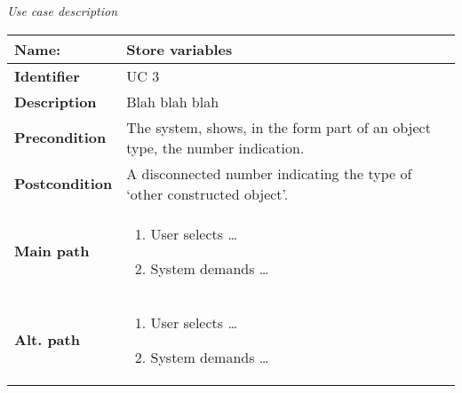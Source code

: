 \documentclass{article}
\newcommand\addrow[2]{#1 &#2\\ }
\newcommand\addheading[2]{#1 &#2\\ \hline}
\newcommand\tabularhead{\begin{tabular}{lp{10cm}}
\hline
}
\newcommand\addmulrow[2]{ \begin{minipage}[t][][t]{2.5cm}#1\end{minipage}%
   &\begin{minipage}[t][][t]{10cm}
    \begin{enumerate} #2   \end{enumerate}
    \end{minipage}\\ }
\newenvironment{usecase}{\tabularhead}
{\hline\end{tabular}}
\begin{document}
{\Large\textit{Use case description}} \\
\begin{usecase}
  \addheading{\textbf{Name:}}{Store variables}
  \addheading{\textbf{Identifier}}{UC 3}
  \addrow{\textbf{Description}}{Blah blah blah}
  \addrow{\textbf{Precondition}}{The system, shows, in the form part of an object type, the number   indication.}
  \addrow{\textbf{Postcondition}}{A disconnected number indicating the type of `other constructed object'.}
  \addmulrow{\textbf{Main path}}{
  	\item User selects \ldots
    \item System demands \ldots}
  \addmulrow{\textbf{Alt. path}}{
  	\item User selects \ldots
    \item System demands \ldots}
\end{usecase}
\end{document}
